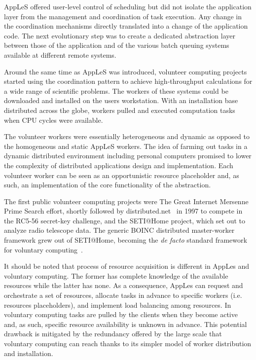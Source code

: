 \documentclass{sig-alternate}
\begin{document}
AppLeS offered user-level control of scheduling but did not isolate the
application layer from the management and coordination of task execution. Any
change in the coordination mechanisms directly translated into a change of the
application code. The next evolutionary step was to create a dedicated
abstraction layer between those of the application and of the various batch
queuing systems available at different remote systems.

Around the same time as AppLeS was introduced, volunteer computing projects
started using the \MW coordination pattern to achieve high-throughput
calculations for a wide range of scientific problems. The workers of these
systems could be downloaded and installed on the users workstation.
With an installation base distributed across the globe, workers pulled and
executed computation tasks when CPU cycles were available.

The volunteer workers were essentially heterogeneous and dynamic as opposed to
the homogeneous and static AppLeS workers. The idea of farming out tasks in a
dynamic distributed environment including personal computers promised to lower
the complexity of distributed applications design and implementation. Each
volunteer worker can be seen as an opportunistic resource placeholder and, as
such, an implementation of the core functionality of the \pilot abstraction.

The first public volunteer computing projects were The Great Internet Mersenne
Prime Search effort\cite{woltman:2004:gimps}, shortly followed by
distributed.net~\cite{Lawton:2000:distributednet} in 1997 to compete in the
RC5-56 secret-key challenge, and the SETI@Home project, which set out to
analyze radio telescope data. The generic BOINC distributed master-worker
framework grew out of SETI@Home, becoming the {\it de facto} standard framework
for voluntary computing~\cite{Anderson:2004:BSP:1032646.1033223}.

It should be noted that process of resource acquisition is different in AppLes
and voluntary computing. The former has complete knowledge of the available
resources while the latter has none.  As a
consequence, AppLes can request and orchestrate a set of resources, allocate
tasks in advance to specific workers (i.e. resources placeholders), and
implement load balancing among resources. In voluntary computing tasks are
pulled by the clients when they become active and, as such, specific resource
availability is unknown in advance. This potential drawback is mitigated by the
redundancy offered by the large scale that voluntary computing can reach thanks
to its simpler model of worker distribution and installation.
\end{document}
